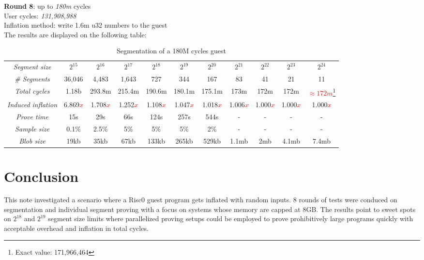 \documentclass[a4paper, 10pt]{article}
\begin{document}
\par \noindent
\textbf{Round 8}: up to \textit{180m} cycles\\
User cycles: \textit{131,908,988}\\
Inflation method: write 1.6m u32 numbers to the guest\\
The results are displayed on the following table: 
\begin{table}[H]
  	\begin{center}
    \label{tab:table9}
    \begin{minipage}{\textwidth}
    \begin{adjustbox}{width=\textwidth}
    \begin{tabular}{c|c|c|c|c|c|c|c|c|c|c}
	  \textit{Segment size} & $2^{15}$ & $2^{16}$ & $2^{17}$ & $2^{18}$ & $2^{19}$ & $2^{20}$ & $2^{21}$ & $2^{22}$ & $2^{23}$ & $2^{24}$\\
	  \textit{\# Segments} & 36,046 & 4,483 & 1,643 & 727 & 344 & 167 & 83 & 41 & 21 & 11\\
	  \textit{Total cycles} & 1.18b & 293.8m & 215.4m & 190.6m & 180.1m & 175.1m & 173m & 172m & 172m & \textcolor{red}{$\approx 172m$}\footnote{Exact value: 171,966,464}\\
	  \textit{Induced inflation} & 6.869\textcolor{red}{$x$} & 1.708\textcolor{red}{$x$} & 1.252\textcolor{red}{$x$} & 1.108\textcolor{red}{$x$} & 1.047\textcolor{red}{$x$} & 1.018\textcolor{red}{$x$} & 1.006\textcolor{red}{$x$} & 1.000\textcolor{red}{$x$} & 1.000\textcolor{red}{$x$} & 1.000\textcolor{red}{$x$}\\
	  \textit{Prove time} & 15s & 29s & 66s & 124s & 257s & 544s & - & - & - & -\\
	  \textit{Sample size} & 0.1\% & 2.5\% & 5\% & 5\% & 5\% & 2\% & - & - & - & -\\
	  \textit{Blob size} & 19kb & 35kb & 67kb & 133kb & 265kb & 529kb & 1.1mb & 2mb & 4.1mb & 7.4mb\\
   	\end{tabular}
   	\end{adjustbox}
   	\end{minipage}
    \caption{Segmentation of a 180M cycles guest}
  \end{center}
\end{table}

\section*{Conclusion}
This note investigated a scenario where a Risc0 guest program gets inflated with random inputs. 8 rounds of tests were conduced on segmentation and individual segment proving with a focus on systems whose memory are capped at 8GB. The results point to sweet spots on $2^{18}$ and $2^{19}$ segment size limits where parallelized proving setups could be employed to prove prohibitively large programs quickly with acceptable overhead and inflation in total cycles.
\end{document}
